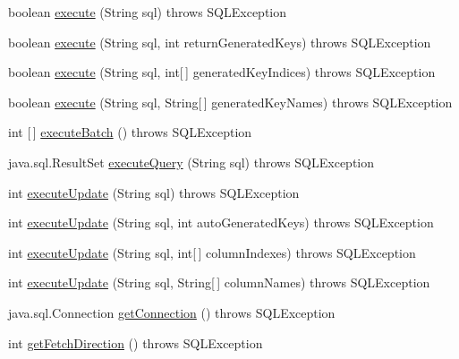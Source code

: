 \begin{DoxyCompactItemize}
\item 
boolean \mbox{\hyperlink{classcom_1_1mysql_1_1jdbc_1_1_statement_impl_a256ef5c122e8a99cb18d436bff0b398e}{execute}} (String sql)  throws S\+Q\+L\+Exception 
\item 
boolean \mbox{\hyperlink{classcom_1_1mysql_1_1jdbc_1_1_statement_impl_a8d055e029c35d81159ecf3ebc89914fe}{execute}} (String sql, int return\+Generated\+Keys)  throws S\+Q\+L\+Exception 
\item 
boolean \mbox{\hyperlink{classcom_1_1mysql_1_1jdbc_1_1_statement_impl_a2a26cd7d2f2c7f9b476750eba63249b7}{execute}} (String sql, int\mbox{[}$\,$\mbox{]} generated\+Key\+Indices)  throws S\+Q\+L\+Exception 
\item 
boolean \mbox{\hyperlink{classcom_1_1mysql_1_1jdbc_1_1_statement_impl_a75e802cf3fe18780f15b9ddd23795e7f}{execute}} (String sql, String\mbox{[}$\,$\mbox{]} generated\+Key\+Names)  throws S\+Q\+L\+Exception 
\item 
int \mbox{[}$\,$\mbox{]} \mbox{\hyperlink{classcom_1_1mysql_1_1jdbc_1_1_statement_impl_acf49c07c2b02c99e25719bb916bc0b39}{execute\+Batch}} ()  throws S\+Q\+L\+Exception 
\item 
java.\+sql.\+Result\+Set \mbox{\hyperlink{classcom_1_1mysql_1_1jdbc_1_1_statement_impl_a0cec26f8a08e9d8e85b10565d4490b1a}{execute\+Query}} (String sql)  throws S\+Q\+L\+Exception 
\item 
int \mbox{\hyperlink{classcom_1_1mysql_1_1jdbc_1_1_statement_impl_aa968966221a50357d4ed7f2d72a94bf6}{execute\+Update}} (String sql)  throws S\+Q\+L\+Exception 
\item 
int \mbox{\hyperlink{classcom_1_1mysql_1_1jdbc_1_1_statement_impl_ab13499dab119bd6814990fb5c64b3463}{execute\+Update}} (String sql, int auto\+Generated\+Keys)  throws S\+Q\+L\+Exception 
\item 
int \mbox{\hyperlink{classcom_1_1mysql_1_1jdbc_1_1_statement_impl_a9ec4107597d72e74f9c21a05108d73b0}{execute\+Update}} (String sql, int\mbox{[}$\,$\mbox{]} column\+Indexes)  throws S\+Q\+L\+Exception 
\item 
int \mbox{\hyperlink{classcom_1_1mysql_1_1jdbc_1_1_statement_impl_af3e2e09209cea46435afa83318cceced}{execute\+Update}} (String sql, String\mbox{[}$\,$\mbox{]} column\+Names)  throws S\+Q\+L\+Exception 
\item 
java.\+sql.\+Connection \mbox{\hyperlink{classcom_1_1mysql_1_1jdbc_1_1_statement_impl_ab4532353069891f565129efa3b648433}{get\+Connection}} ()  throws S\+Q\+L\+Exception 
\item 
int \mbox{\hyperlink{classcom_1_1mysql_1_1jdbc_1_1_statement_impl_a11e0bed244cd5e9316cb1abb6e801b7a}{get\+Fetch\+Direction}} ()  throws S\+Q\+L\+Exception 

\end{DoxyCompactItemize}
